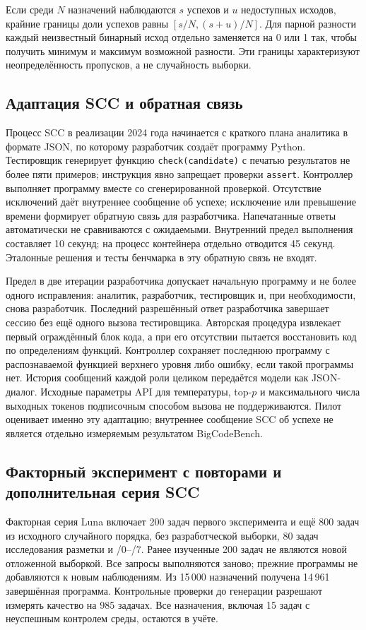 Если среди $N$ назначений наблюдаются $s$ успехов и $u$ недоступных исходов, крайние границы доли успехов равны $[s/N,(s+u)/N]$. Для парной разности каждый неизвестный бинарный исход отдельно заменяется на 0 или 1 так, чтобы получить минимум и максимум возможной разности. Эти границы характеризуют неопределённость пропусков, а не случайность выборки.

\subsection{Адаптация SCC и обратная связь}
Процесс SCC в реализации 2024 года начинается с краткого плана аналитика в формате JSON, по которому разработчик создаёт программу Python. Тестировщик генерирует функцию \texttt{check(candidate)} с печатью результатов не более пяти примеров; инструкция явно запрещает проверки \texttt{assert}. Контроллер выполняет программу вместе со сгенерированной проверкой. Отсутствие исключений даёт внутреннее сообщение об успехе; исключение или превышение времени формирует обратную связь для разработчика. Напечатанные ответы автоматически не сравниваются с ожидаемыми. Внутренний предел выполнения составляет 10 секунд; на процесс контейнера отдельно отводится 45 секунд. Эталонные решения и тесты бенчмарка в эту обратную связь не входят.

Предел в две итерации разработчика допускает начальную программу и не более одного исправления: аналитик, разработчик, тестировщик и, при необходимости, снова разработчик. Последний разрешённый ответ разработчика завершает сессию без ещё одного вызова тестировщика. Авторская процедура извлекает первый ограждённый блок кода, а при его отсутствии пытается восстановить код по определениям функций. Контроллер сохраняет последнюю программу с распознаваемой функцией верхнего уровня либо ошибку, если такой программы нет. История сообщений каждой роли целиком передаётся модели как JSON-диалог. Исходные параметры API для температуры, top-$p$ и максимального числа выходных токенов подписочным способом вызова не поддерживаются. Пилот оценивает именно эту адаптацию; внутреннее сообщение SCC об успехе не является отдельно измеряемым результатом BigCodeBench.

\subsection{Факторный эксперимент с повторами и дополнительная серия SCC}
\label{app:expanded-studies}
Факторная серия Luna включает 200 задач первого эксперимента и ещё 800 задач из исходного случайного порядка, без разработческой выборки, 80 задач исследования разметки и /0--/7. Ранее изученные 200 задач не являются новой отложенной выборкой. Все запросы выполняются заново; прежние программы не добавляются к новым наблюдениям. Из 15\,000 назначений получена 14\,961 завершённая программа. Контрольные проверки до генерации разрешают измерять качество на 985 задачах. Все назначения, включая 15 задач с неуспешным контролем среды, остаются в учёте.

